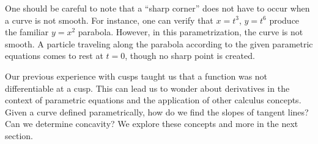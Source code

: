 One should be careful to note that a ``sharp corner'' does not have to occur when a curve is not smooth. For instance, one can verify that $x=t^3$, $y=t^6$ produce the familiar $y=x^2$ parabola. However, in this parametrization, the curve is not smooth. A particle traveling along the parabola according to the given parametric equations comes to rest at $t=0$, though no sharp point is created.\bigskip

Our previous experience with cusps taught us that a function was not differentiable at a cusp. This can lead us to wonder about derivatives in the context of parametric equations and the application of other calculus concepts. Given a curve defined parametrically, how do we find the slopes of tangent lines? Can we determine concavity? We explore these concepts and more in the next section.

